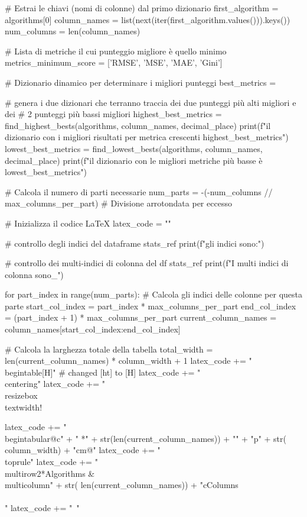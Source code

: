 \begin{itemize}
    # Estrai le chiavi (nomi di colonne) dal primo dizionario
    first_algorithm = algorithms[0]
    column_names = list(next(iter(first_algorithm.values())).keys())
    num_columns = len(column_names)

    # Lista di metriche il cui punteggio migliore è quello minimo
    metrics_minimum_score = ['RMSE', 'MSE', 'MAE', 'Gini']

    # Dizionario dinamico per determinare i migliori punteggi
    best_metrics = {}

    # genera i due dizionari che terranno traccia dei due punteggi più alti migliori e dei
    # 2 punteggi più bassi migliori
    highest_best_metrics = find_highest_bests(algorithms, column_names, decimal_place)
    print(f"il dizionario con i migliori risultati per metrica crescenti {highest_best_metrics}")
    lowest_best_metrics = find_lowest_bests(algorithms, column_names, decimal_place)
    print(f"il dizionario con le migliori metriche più basse è {lowest_best_metrics}")

    # Calcola il numero di parti necessarie
    num_parts = -(-num_columns // max_columns_per_part)  # Divisione arrotondata per eccesso

    # Inizializza il codice LaTeX
    latex_code = ""

    # controllo degli indici del dataframe stats_ref
    print(f"gli indici sono:\n")

    # controllo dei multi-indici di colonna del df stats_ref
    print(f"I multi indici di colonna sono_")

    for part_index in range(num_parts):
        # Calcola gli indici delle colonne per questa parte
        start_col_index = part_index * max_columns_per_part
        end_col_index = (part_index + 1) * max_columns_per_part
        current_column_names = column_names[start_col_index:end_col_index]

        # Calcola la larghezza totale della tabella
        total_width = len(current_column_names) * column_width + 1
        latex_code += "\\begin{table}[H]\n"  # changed [ht] to [H]
        latex_code += "\\centering\n"
        latex_code += "\\resizebox{\\textwidth}{!}{%
        latex_code += "\\begin{tabular}{@{}c" + " *{" + str(len(current_column_names)) + "}{" + "p{" + str(
            column_width) + "cm}}@{}}\n"
        latex_code += "\\toprule\n"
        latex_code += "\\multirow{2}{*}{Algorithms} & \\multicolumn{" + str(
            len(current_column_names)) + "}{c}{Columns} \\\\\n"
        latex_code += "\\cmidrule{2-" + str(len(current_column_names) + 1) + "}\n"

}
\end{itemize}
